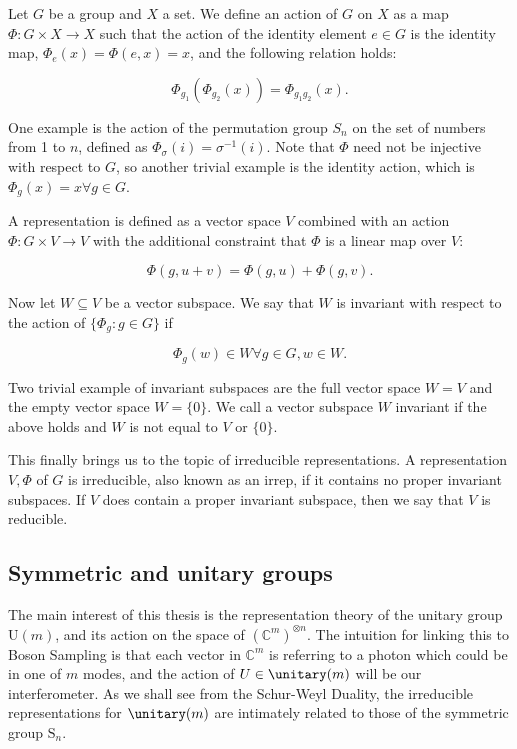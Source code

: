 Let $G$ be a group and $X$ a set. We define an action of $G$ on $X$ as a map $\Phi\colon G\times X \rightarrow X$ such that the action of the identity element $e\in G$ is the identity map, $\Phi_e(x) = \Phi(e, x) = x$, and the following relation holds:

\begin{equation}
\Phi_{g_1}(\Phi_{g_2}(x)) = \Phi_{g_1g_2}(x).
\end{equation}

One example is the action of the permutation group $S_n$ on the set of numbers from 1 to $n$, defined as $\Phi_\sigma(i) = \sigma^{-1}(i)$. Note that $\Phi$ need not be injective with respect to $G$, so another trivial example is the identity action, which is $\Phi_g(x) = x \forall g \in G$.

A representation is defined as a vector space $V$ combined with an action $\Phi: G \times V \rightarrow V$ with the additional constraint that $\Phi$ is a linear map over $V$:

\begin{equation}
\Phi(g, u+v) = \Phi(g, u) + \Phi(g, v).
\end{equation}

Now let $W \subseteq V$ be a vector subspace. We say that $W$ is invariant with respect to the action of $\{\Phi_g\colon g\in G\}$ if

\begin{equation}
\Phi_g(w) \in W \forall g \in G, w \in W.
\end{equation}

Two trivial example of invariant subspaces are the full vector space $W=V$ and the empty vector space $W=\{0\}$. We call a vector subspace $W$ invariant if the above holds and $W$ is not equal to $V$ or $\{0\}$.

This finally brings us to the topic of irreducible representations. A representation $V, \Phi$ of $G$ is irreducible, also known as an irrep, if it contains no proper invariant subspaces. If $V$ does contain a proper invariant subspace, then we say that $V$ is reducible.

\subsection{Symmetric and unitary groups}
\label{ssec:symmetric-and-unitary-groups}

The main interest of this thesis is the representation theory of the unitary group U$(m)$, and its action on the space of $(\mathbb{C}^{m})^{\otimes n}$. The intuition for linking this to Boson Sampling is that each vector in $\mathbb{C}^m$ is referring to a photon which could be in one of $m$ modes, and the action of $U \in \unitary(m)$ will be our interferometer.
As we shall see from the Schur-Weyl Duality, the irreducible representations for $\unitary(m)$ are intimately related to those of the symmetric group $\textrm{S}_n$.


